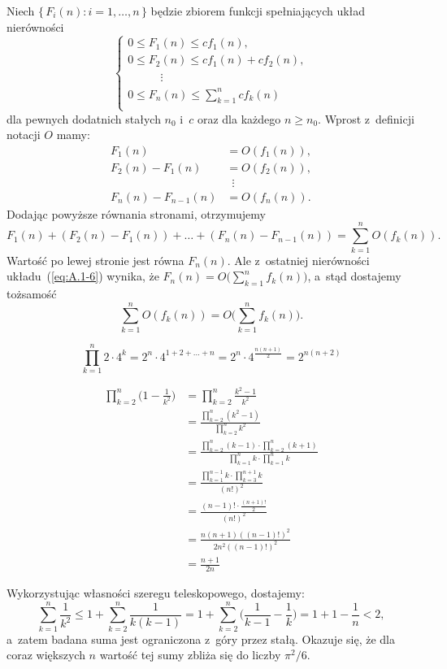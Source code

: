 Niech $\{\,F_i(n):i=1,\dots,n\,\}$ będzie zbiorem funkcji spełniających układ nierówności
\[
	\begin{cases}
		0 \le F_1(n) \le cf_1(n), \\
		0 \le F_2(n) \le cf_1(n)+cf_2(n), \\
		\phantom{0 \le F_2} \vdots \\
		0 \le F_n(n) \le \sum_{k=1}^ncf_k(n) \\
	\end{cases} \tag{$*$}\label{eq:A.1-6}
\]
dla pewnych dodatnich stałych $n_0$ i~$c$ oraz dla każdego $n\ge n_0$. Wprost z~definicji notacji $O$ mamy:
\begin{align*}
	F_1(n) &= O(f_1(n)), \\
	F_2(n)-F_1(n) &= O(f_2(n)), \\
	& \,\,\,\vdots \\
	F_n(n)-F_{n-1}(n) &= O(f_n(n)).
\end{align*}
Dodając powyższe równania stronami, otrzymujemy
\[
	F_1(n)+(F_2(n)-F_1(n))+\dots+(F_n(n)-F_{n-1}(n)) = \sum_{k=1}^nO(f_k(n)).
\]
Wartość po lewej stronie jest równa $F_n(n)$. Ale z~ostatniej nierówności układu~(\ref{eq:A.1-6}) wynika, że $F_n(n)=O\bigl(\sum_{k=1}^nf_k(n)\bigr)$, a~stąd dostajemy tożsamość
\[
	\sum_{k=1}^nO(f_k(n)) = O\biggl(\sum_{k=1}^nf_k(n)\biggr).
\]

\exercise %
\[
	\prod_{k=1}^n2\cdot4^k = 2^n\cdot4^{1+2+\dots+n} = 2^n\cdot4^{\frac{n(n+1)}{2}} = 2^{n(n+2)}
\]

\exercise %
\begin{align*}
	\prod_{k=2}^n\biggl(1-\frac{1}{k^2}\biggr) &= \prod_{k=2}^n\frac{k^2-1}{k^2} \\[2mm]
	&= \frac{\prod_{k=2}^n(k^2-1)}{\prod_{k=2}^nk^2} \\[2mm]
	&= \frac{\prod_{k=2}^n(k-1)\cdot\prod_{k=2}^n(k+1)}{\prod_{k=1}^nk\cdot\prod_{k=1}^nk} \\[2mm]
	&= \frac{\prod_{k=1}^{n-1}k\cdot\prod_{k=3}^{n+1}k}{(n!)^2} \\[2mm]
	&= \frac{(n-1)!\cdot\frac{(n+1)!}{2}}{(n!)^2} \\[2mm]
	&= \frac{n(n+1)((n-1)!)^2}{2n^2((n-1)!)^2} \\[2mm]
	&= \frac{n+1}{2n}
\end{align*}


\exercise %
Wykorzystując własności szeregu teleskopowego, dostajemy:
\[
	\sum_{k=1}^n\frac{1}{k^2} \le 1+\sum_{k=2}^n\frac{1}{k(k-1)} = 1+\sum_{k=2}^n\biggl(\frac{1}{k-1}-\frac{1}{k}\biggr) = 1+1-\frac{1}{n} < 2,
\]
a~zatem badana suma jest ograniczona z~góry przez stałą. Okazuje się, że dla coraz większych $n$ wartość tej sumy zbliża się do liczby $\pi^2\!/6$.

